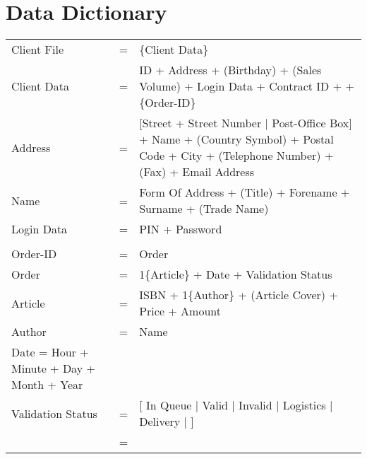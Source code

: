 \documentclass[12pt,a4paper]{article}
\begin{document}

\section{Data Dictionary}

\begin{comment}

Required Data (top level)
------------------------
Client File
Order


\end{comment}

\begin{tabular}{p{4cm}p{0.5cm}p{8cm}}
Client File & = & \{Client Data\} \\
Client Data & = & ID + Address + (Birthday) + (Sales Volume) + Login Data + Contract ID +  + \{Order-ID\}\\
Address & = & [Street + Street Number $|$ Post-Office Box] + Name +  (Country Symbol) +  Postal Code + City + (Telephone Number) + (Fax) + Email Address\\
Name & = & Form Of Address + (Title) + Forename + Surname + (Trade Name)\\
Login Data & = & PIN + Password \\
\\
Order-ID & = & Order \\
Order & = & 1\{Article\} + Date + Validation Status\\
Article & = & ISBN + 1\{Author\} + (Article Cover) + Price +  Amount\\
Author & = & Name \\
Date = Hour + Minute + Day + Month + Year\\
Validation Status & = & [  In Queue $|$ Valid $|$ Invalid $|$ Logistics $|$ Delivery $|$  ] \\
& = &  \\
\end{tabular}
\end{document}
